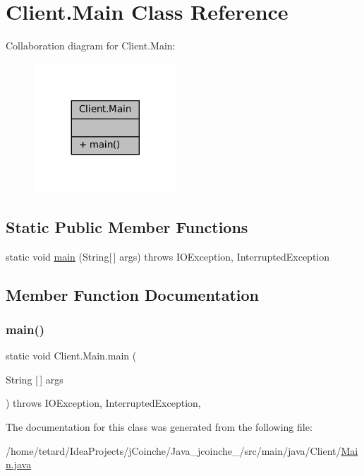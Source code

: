 \hypertarget{classClient_1_1Main}{}\section{Client.\+Main Class Reference}
\label{classClient_1_1Main}


Collaboration diagram for Client.\+Main\+:
\nopagebreak
\begin{figure}[H]
\begin{center}
\leavevmode
\includegraphics[width=152pt]{classClient_1_1Main__coll__graph}
\end{center}
\end{figure}
\subsection*{Static Public Member Functions}
\begin{DoxyCompactItemize}
\item 
static void \mbox{\hyperlink{classClient_1_1Main_aa2aae7f6458f541210f294b25fb7ef02}{main}} (String\mbox{[}$\,$\mbox{]} args)  throws I\+O\+Exception, Interrupted\+Exception 
\end{DoxyCompactItemize}


\subsection{Member Function Documentation}
\mbox{\label{classClient_1_1Main_aa2aae7f6458f541210f294b25fb7ef02}} 
\subsubsection{\texorpdfstring{main()}{main()}}
{\footnotesize\ttfamily static void Client.\+Main.\+main (\begin{DoxyParamCaption}\item[{String \mbox{[}$\,$\mbox{]}}]{args }\end{DoxyParamCaption}) throws I\+O\+Exception, Interrupted\+Exception\hspace{0.3cm}{\ttfamily [inline]}, {\ttfamily [static]}}



The documentation for this class was generated from the following file\+:\begin{DoxyCompactItemize}
\item 
/home/tetard/\+Idea\+Projects/j\+Coinche/\+Java\+\_\+jcoinche\+\_/src/main/java/\+Client/\mbox{\hyperlink{Client_2Main_8java}{Main.\+java}}\end{DoxyCompactItemize}
